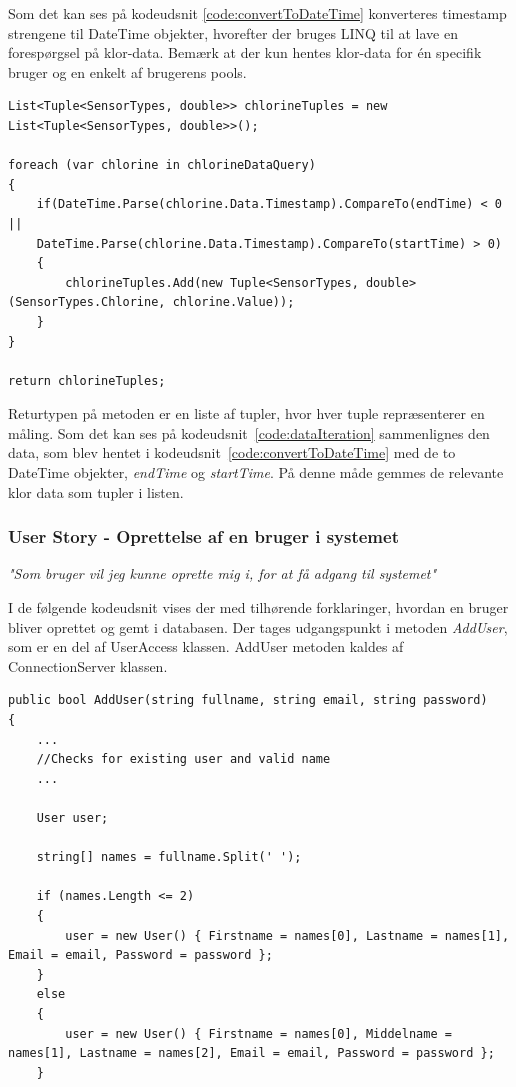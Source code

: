 Som det kan ses på kodeudsnit \ref{code:convertToDateTime} konverteres timestamp strengene til DateTime objekter, hvorefter der bruges LINQ til at lave en forespørgsel på klor-data. Bemærk at der kun hentes klor-data for én specifik bruger og en enkelt af brugerens pools.

\begin{lstlisting}[caption=Iteration over indhentet pool data,label=code:dataIteration]
List<Tuple<SensorTypes, double>> chlorineTuples = new List<Tuple<SensorTypes, double>>();

foreach (var chlorine in chlorineDataQuery)
{
	if(DateTime.Parse(chlorine.Data.Timestamp).CompareTo(endTime) < 0 ||
	DateTime.Parse(chlorine.Data.Timestamp).CompareTo(startTime) > 0)
	{
		chlorineTuples.Add(new Tuple<SensorTypes, double>(SensorTypes.Chlorine, chlorine.Value));
	}
}

return chlorineTuples;
\end{lstlisting}

Returtypen på metoden er en liste af tupler, hvor hver tuple repræsenterer en måling. Som det kan ses på kodeudsnit~\ref{code:dataIteration} sammenlignes den data, som blev hentet i kodeudsnit~\ref{code:convertToDateTime} med de to DateTime objekter, \textit{endTime} og \textit{startTime}. På denne måde gemmes de relevante klor data som tupler i listen.

\subsubsection{User Story - Oprettelse af en bruger i systemet}

\textit{"Som bruger vil jeg kunne oprette mig i, for at få adgang til systemet"}

I de følgende kodeudsnit vises der med tilhørende forklaringer, hvordan en bruger bliver oprettet og gemt i databasen. Der tages udgangspunkt i metoden \textit{AddUser}, som er en del af UserAccess klassen. AddUser metoden kaldes af ConnectionServer klassen.
 
\begin{lstlisting}[caption=User laves lokalt hvorefter User's navne properties sættes, label=code:adduser1]
public bool AddUser(string fullname, string email, string password)
{
	...
	//Checks for existing user and valid name
	...
	
	User user;

	string[] names = fullname.Split(' ');

	if (names.Length <= 2)
	{
		user = new User() { Firstname = names[0], Lastname = names[1], Email = email, Password = password };
	}
	else
	{
		user = new User() { Firstname = names[0], Middelname = names[1], Lastname = names[2], Email = email, Password = password };
	}
\end{lstlisting}


